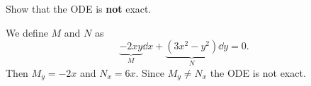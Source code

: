 Show that the ODE is \textbf{not} exact.

\nnl We define $M$ and $N$ as
$$\underbrace{-2xy}_{M} \dd x + \underbrace{(3x^2 -y^2)}_{N} \dd y = 0.$$
Then $M_y = -2x$ and $N_x = 6x$. Since $M_y \neq N_x$ the ODE is not exact.